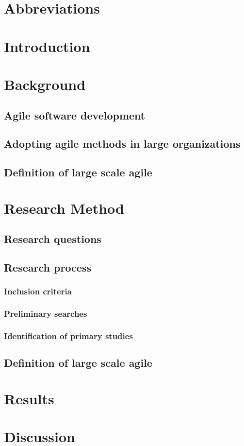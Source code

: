 \documentclass{article}
\author{Ville Kumpulainen}
\begin{document}



\tableofcontents
\newpage
\section*{Abbreviations}

\newpage

\section{Introduction}


\section{Background}
\lipsum[1]
\subsection{Agile software development}
\lipsum[2]
\subsection{Adopting agile methods in large organizations}
\lipsum[3]
\subsection{Definition of large scale agile}
\lipsum[4]

\section{Research Method}
\lipsum[4]
\subsection{Research questions}
\lipsum[5]
\subsection{Research process}
\lipsum[6]
\subsubsection{Inclusion criteria}
\lipsum[7]
\subsubsection{Preliminary searches}
\lipsum[8]
\subsubsection{Identification of primary studies}
\lipsum[9]

\subsection{Definition of large scale agile}
\lipsum[8]

\section{Results}
\lipsum[8]
\lipsum[9]
\lipsum[10]
\lipsum[11]

\section{Discussion}
\lipsum[12]
\lipsum[13]
\lipsum[14]
\lipsum[15]
\end{document}
